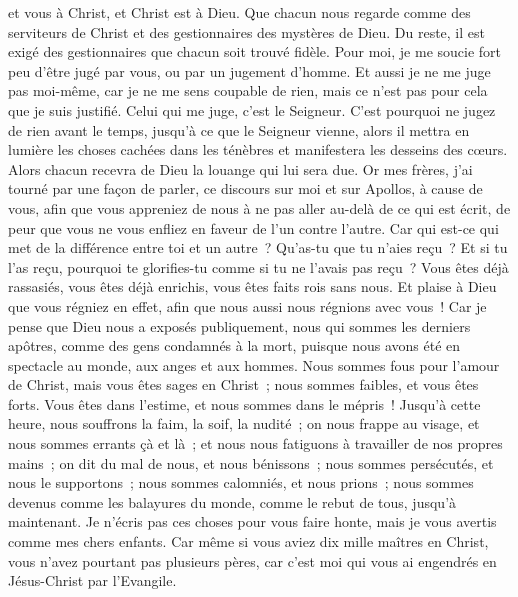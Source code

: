 \begin{multicols}{2}
et vous à Christ, et Christ est à Dieu.
\VerseOne{}Que chacun nous regarde comme des serviteurs de Christ et des gestionnaires des mystères de Dieu.
Du reste, il est exigé des gestionnaires que chacun soit trouvé fidèle.
Pour moi, je me soucie fort peu d'être jugé par vous, ou par un jugement d'homme. Et aussi je ne me juge pas moi-même, car je ne me sens coupable de rien,
mais ce n'est pas pour cela que je suis justifié. Celui qui me juge, c'est le Seigneur.
C'est pourquoi ne jugez de rien avant le temps, jusqu'à ce que le Seigneur vienne, alors il mettra en lumière les choses cachées dans les ténèbres et manifestera les desseins des cœurs. Alors chacun recevra de Dieu la louange qui lui sera due.
Or mes frères, j'ai tourné par une façon de parler, ce discours sur moi et sur Apollos, à cause de vous, afin que vous appreniez de nous à ne pas aller au-delà de ce qui est écrit, de peur que vous ne vous enfliez en faveur de l'un contre l'autre.
Car qui est-ce qui met de la différence entre toi et un autre~? Qu'as-tu que tu n'aies reçu~? Et si tu l'as reçu, pourquoi te glorifies-tu comme si tu ne l'avais pas reçu~?
Vous êtes déjà rassasiés, vous êtes déjà enrichis, vous êtes faits rois sans nous. Et plaise à Dieu que vous régniez en effet, afin que nous aussi nous régnions avec vous~!
Car je pense que Dieu nous a exposés publiquement, nous qui sommes les derniers apôtres, comme des gens condamnés à la mort, puisque nous avons été en spectacle au monde, aux anges et aux hommes.
Nous sommes fous pour l'amour de Christ, mais vous êtes sages en Christ~; nous sommes faibles, et vous êtes forts. Vous êtes dans l'estime, et nous sommes dans le mépris~!
Jusqu'à cette heure, nous souffrons la faim, la soif, la nudité~; on nous frappe au visage, et nous sommes errants çà et là~;
et nous nous fatiguons à travailler de nos propres mains~; on dit du mal de nous, et nous bénissons~; nous sommes persécutés, et nous le supportons~;
nous sommes calomniés, et nous prions~; nous sommes devenus comme les balayures du monde, comme le rebut de tous, jusqu'à maintenant.
Je n'écris pas ces choses pour vous faire honte, mais je vous avertis comme mes chers enfants.
Car même si vous aviez dix mille maîtres en Christ, vous n'avez pourtant pas plusieurs pères, car c'est moi qui vous ai engendrés en Jésus-Christ par l'Evangile.

\end{multicols}

